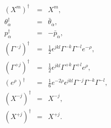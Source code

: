 \begin{equation}
\begin{array}{rcl}
(X^m)^{\dagger} &=& X^m,\\
\theta^{\dagger}_{\alpha} &=&
\bar{\theta}_{\dot\alpha}, \\
p_{\alpha}^{\dagger}     &=&
-\bar{p}_{\dot\alpha} ,\\
(\Gamma^{-j})^{\dagger} &=& \frac{1}{2}
\epsilon^{jkl}\Gamma^{-k}\Gamma^{-l}e^{-\rho},
\\
(\Gamma^{+j})^{\dagger}    &=& \frac{1}{2}
\epsilon^{jkl}\Gamma^{+k}\Gamma^{+l}e^{\rho}
,\\
(e^{\rho})^{\dagger} &=& \frac{1}{6}
e^{-2\rho}\epsilon^{jkl}\Gamma^{-j}\Gamma^{-k}\Gamma^{-l},
\\
(X^{-j})^{\dagger} &=& X^{-j} ,\\
(X^{+j})^{\dagger} &=& X^{+j}.
\end{array}
\end{equation}

